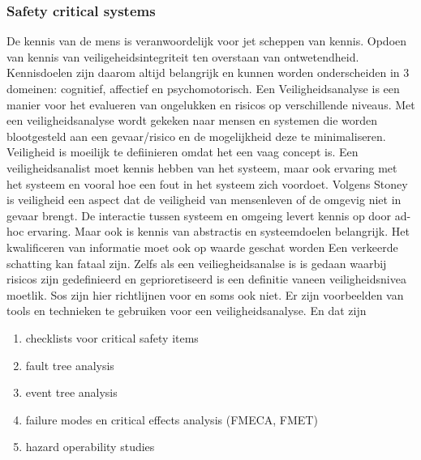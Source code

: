 \documentclass{article}
\begin{document}
	\subsubsection{Safety critical systems}
	
	De kennis van de mens is veranwoordelijk voor jet scheppen van kennis. Opdoen van kennis van veiligeheidsintegriteit ten overstaan van ontwetendheid. Kennisdoelen zijn daarom altijd belangrijk en kunnen worden onderscheiden in 3 domeinen: cognitief, affectief en psychomotorisch.\cite{winceckCriticalToSafety}
	Een Veiligheidsanalyse is een manier voor het evalueren  van ongelukken en risicos op verschillende niveaus. Met een veiligheidsanalyse wordt gekeken naar mensen en systemen die worden blootgesteld aan een gevaar/risico en de mogelijkheid deze te minimaliseren.
	Veiligheid is moeilijk te defiinieren omdat het een vaag concept is.
	Een veiligheidsanalist  moet kennis hebben van het systeem, maar ook ervaring met het systeem en vooral hoe een fout in het systeem zich voordoet.
	Volgens Stoney\cite{chambersHazardAnalysisSCS} is veiligheid een aspect dat de veiligheid van mensenleven  of de omgevig niet in gevaar brengt.
	De interactie tussen systeem en omgeing levert kennis op door ad-hoc ervaring. Maar ook is kennis van abstractis en systeemdoelen belangrijk.
	Het kwalificeren van informatie moet ook op waarde geschat worden Een verkeerde schatting kan fataal zijn. Zelfs als een veiliegheidsanalse is is gedaan waarbij risicos zijn gedefinieerd en geprioretiseerd is een definitie vaneen veiligheidsnivea moetlik. Sos zijn hier richtlijnen voor en soms ook niet.
	Er zijn voorbeelden van tools en technieken te gebruiken voor een veiligheidsanalyse. En dat zijn 
	\begin{enumerate}
		\item   checklists voor critical safety items
		\item  fault tree analysis
		\item  event tree analysis
		\item failure modes en critical effects analysis (FMECA, FMET)
		\item hazard operability studies
	\end{enumerate}
	
\end{document}
